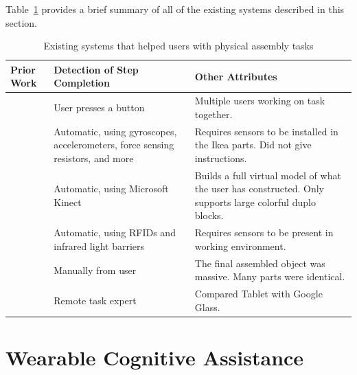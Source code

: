 Table~\ref{table:prior_work} provides a brief summary of all of the existing
systems described in this section.

\begin{table}
  \begin{tabular}{| l | p{2in} | p{2.5in} |}
    \hline
    Prior Work & Detection of Step Completion & Other Attributes\\
    \hline
    \citet{webuild} & User presses a button & Multiple users working on task
                                              together.\\
    \hline
    \citet{sensors} & Automatic, using gyroscopes, accelerometers, force sensing
                      resistors, and more & Requires sensors to be installed in
                                            the Ikea parts. Did not give
                                            instructions.\\
    \hline
    \citet{kinect} & Automatic, using Microsoft Kinect & Builds a full virtual
                                                         model of what the user
                                                         has constructed. Only
                                                         supports large colorful
                                                         duplo blocks. \\
    \hline
    \citet{smartwatch} & Automatic, using RFIDs and infrared light barriers
                                              & Requires sensors to be present
                                                in working environment.\\
    \hline
    \citet{robotic_arm} & Manually from user
                                              & The final assembled object was
                                                massive. Many parts were
                                                identical.\\
    \hline
    \citet{collaboration} & Remote task expert
                                              & Compared Tablet with Google
                                                Glass.\\
    \hline
\end{tabular}
\caption{
  Existing systems that helped users with physical assembly tasks
}\label{table:prior_work}
\end{table}

\section{Wearable Cognitive Assistance}

